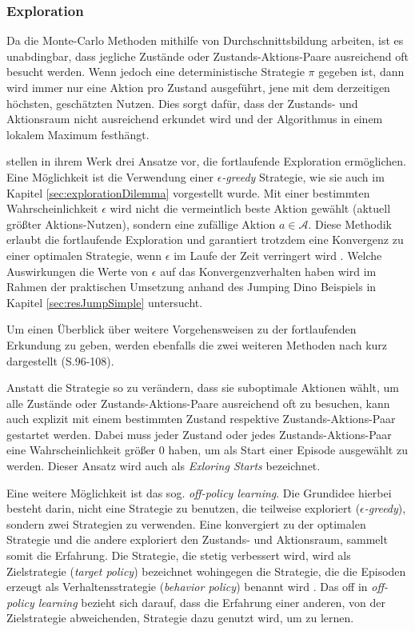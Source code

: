 \subsubsection{Exploration}\label{sec:exploration}
Da die Monte-Carlo Methoden mithilfe von Durchschnittsbildung arbeiten, ist es unabdingbar, dass jegliche Zustände oder Zustands-Aktions-Paare ausreichend oft besucht werden. Wenn jedoch eine deterministische Strategie $\pi$ gegeben ist, dann wird immer nur eine Aktion pro Zustand ausgeführt, jene mit dem derzeitigen höchsten, geschätzten Nutzen. Dies sorgt dafür, dass der Zustands- und Aktionsraum nicht ausreichend erkundet wird und der Algorithmus in einem lokalem Maximum festhängt.
\par 
\cite{Sutton1998} stellen in ihrem Werk drei Ansatze vor, die fortlaufende Exploration ermöglichen. Eine Möglichkeit ist die Verwendung einer $\epsilon$\textit{-greedy} Strategie, wie sie auch im Kapitel \ref{sec:explorationDilemma} vorgestellt wurde. Mit einer bestimmten Wahrscheinlichkeit $\epsilon$ wird nicht die vermeintlich beste Aktion gewählt (aktuell größter  Aktions-Nutzen), sondern eine zufällige Aktion $a \in \mathcal{A}$. Diese Methodik erlaubt die fortlaufende Exploration und garantiert trotzdem eine Konvergenz zu einer optimalen Strategie, wenn $\epsilon$ im Laufe der Zeit verringert wird \cite[S.~201]{Sutton1998}. Welche Auswirkungen die Werte von $\epsilon$ auf das Konvergenzverhalten haben wird im Rahmen der praktischen Umsetzung anhand des Jumping Dino Beispiels in Kapitel \ref{sec:resJumpSimple} untersucht.
\par 
Um einen Überblick über weitere Vorgehensweisen zu der fortlaufenden Erkundung zu geben, werden ebenfalls die zwei weiteren Methoden nach \cite{Sutton1998} kurz dargestellt (S.96-108). 
\par 
Anstatt die Strategie so zu verändern, dass sie suboptimale Aktionen wählt, um alle Zustände oder Zustands-Aktions-Paare ausreichend oft zu besuchen, kann auch explizit mit einem bestimmten Zustand respektive Zustands-Aktions-Paar gestartet werden. Dabei muss jeder Zustand oder jedes Zustands-Aktions-Paar eine Wahrscheinlichkeit größer 0 haben, um als Start einer Episode ausgewählt zu werden. Dieser Ansatz wird auch als \textit{Exloring Starts} bezeichnet.
\par
Eine weitere Möglichkeit ist das sog. \textit{off-policy learning}. Die Grundidee hierbei besteht darin, nicht eine Strategie zu benutzen, die teilweise exploriert ($\epsilon$\textit{-greedy}), sondern zwei Strategien zu verwenden. Eine konvergiert zu der optimalen Strategie und die andere exploriert den Zustands- und Aktionsraum, sammelt somit die Erfahrung. Die Strategie, die stetig verbessert wird, wird als Zielstrategie (\textit{target policy}) bezeichnet wohingegen die Strategie, die die Episoden erzeugt als Verhaltensstrategie (\textit{behavior policy}) benannt wird \cite[S.~103]{Sutton1998}. Das \glqq off \grqq{} in \textit{off-policy learning} bezieht sich darauf, dass die Erfahrung einer anderen, von der Zielstrategie abweichenden, Strategie dazu genutzt wird, um zu lernen.
\pagebreak
